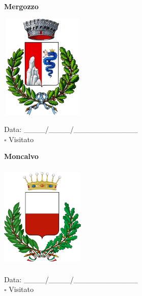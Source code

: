 \documentclass[a5paper,12pt]{article}
\begin{document}
\newpage

\noindent
\begin{minipage}[t]{0.45\textwidth}
    \begin{center}
        \textbf{Mergozzo}
    \end{center}
    \vspace{-0.5cm} %
    \begin{center}
        \includegraphics[height= 5cm, width=4cm]{Piemonte/Stemma Mergozzo.png}
    \end{center}
    \vspace{-0.4cm} %
    \begin{flushleft}
        Data: \_\_\_\_/\_\_\_\_/\_\_\_\_\_\_\_\_\_\_\_\_ \\
        $\square$ Visitato
    \end{flushleft}
\end{minipage}
\hfill
\noindent
\begin{minipage}[t]{0.45\textwidth}
    \begin{center}
        \textbf{Moncalvo}
    \end{center}
    \vspace{-0.5cm} %
    \begin{center}
        \includegraphics[height= 5cm, width=4cm]{Piemonte/Stemma Moncalvo.png}
    \end{center}
    \vspace{-0.4cm} %
    \begin{flushleft}
        Data: \_\_\_\_/\_\_\_\_/\_\_\_\_\_\_\_\_\_\_\_\_ \\
        $\square$ Visitato
    \end{flushleft}
\end{minipage}
\end{document}
